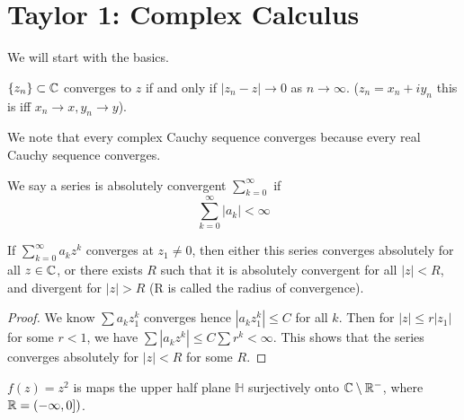 \chapter{Taylor 1: Complex Calculus}
We will start with the basics.
\begin{defn}[convergence]
    $\{z_n\}\subset\mathbb{C}$ converges to $z$ if and only if $|z_n-z|\to 0$ as $n\to\infty$. ($z_n=x_n+iy_n$ this is iff $x_n\to x, y_n\to y$).
\end{defn}
We note that every complex Cauchy sequence converges because every real Cauchy sequence converges.

\begin{defn}
    We say a series is absolutely convergent $\sum_{k=0}^\infty$ if 
    \begin{equation*}
        \sum_{k=0}^\infty |a_k|<\infty
    \end{equation*}
\end{defn}
\begin{prop}
    If $\sum_{k=0}^{\infty} a_kz^k$ converges at $z_1\neq 0$, then either this series converges absolutely for all $z\in\mathbb{C}$, or there exists $R$ such that it is absolutely convergent for all $|z|<R$, and divergent for $|z|>R$ (R is called the radius of convergence).
\end{prop}
\begin{proof}
    We know $\sum a_kz_1^k$ converges hence $|a_kz_1^k|\leq C$ for all $k$. Then for $|z|\leq r|z_1|$ for some $r<1$, we have $\sum|a_kz^k|\leq C\sum r^k<\infty$. This shows that the series converges absolutely for $|z|<R$ for some $R$.
\end{proof}




\begin{example}
    $f(z)=z^2$ is maps the upper half plane $\mathbb{H}$ surjectively onto $\mathbb{C}\setminus \mathbb{R}^{-}$, where $\mathbb{R}=(-\infty, 0])$.
\end{example}


